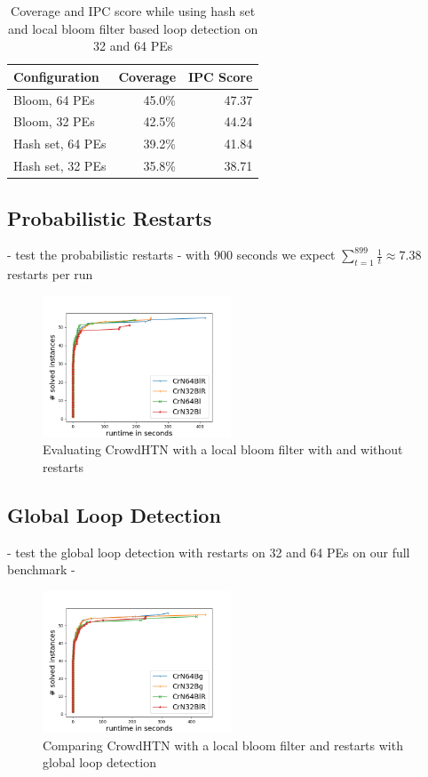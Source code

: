 \begin{table}
	\caption{Coverage and IPC score while using hash set and local bloom filter based loop detection on 32 and 64 PEs}
	\label{table: eval loop detection}
	\centering
	\begin{tabular}{| l | r | r |}
		\hline
		Configuration & Coverage & IPC Score \\
		\hline
		Bloom, 64 PEs		& 45.0\%	& 47.37 \\ %
		Bloom, 32 PEs		& 42.5\%	& 44.24 \\ %
		Hash set, 64 PEs	& 39.2\%	& 41.84 \\ %
		Hash set, 32 PEs	& 35.8\%	& 38.71 \\ %
		\hline
	\end{tabular}
\end{table}

\subsection{Probabilistic Restarts}
\label{eval: restarts}
- test the probabilistic restarts
- with 900 seconds we expect $\sum_{t=1}^{899} \frac{1}{t} \approx 7.38$ restarts per run

\begin{figure}
	\caption{Evaluating CrowdHTN with a local bloom filter with and without restarts}
	\label{figure: restarts}
	\centering
	\includegraphics[width=0.5\textwidth]{images/final/restarts}
\end{figure}
\todo{}

\subsection{Global Loop Detection}
\label{eval: global loop}
- test the global loop detection with restarts on 32 and 64 PEs on our full benchmark
- 
\begin{figure}
	\caption{Comparing CrowdHTN with a local bloom filter and restarts with global loop detection}
	\label{figure: global loops}
	\centering
	\includegraphics[width=0.5\textwidth]{images/final/global_loops}
\end{figure}


